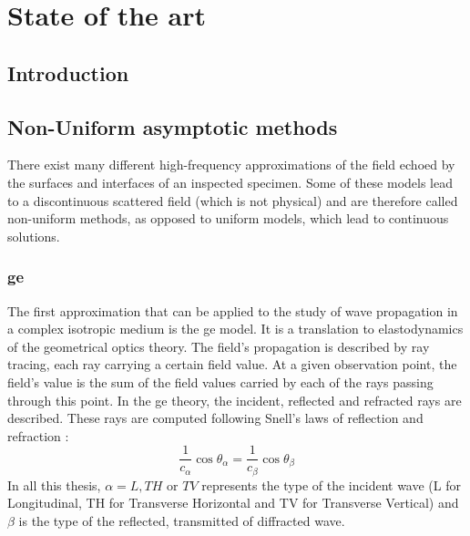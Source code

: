 \chapter[][Sate of the Art]{State of the art}
\label{chap-biblio}

\section*{Introduction}

\section{Non-Uniform asymptotic methods}

There exist many different high-frequency approximations of the field echoed by the surfaces and interfaces of an inspected specimen. Some of these models lead to a discontinuous scattered field (which is not physical) and are therefore called non-uniform methods, as opposed to uniform models, which lead to continuous solutions.
\subsection{\acrfull{ge}}
The first approximation that can be applied to the study of wave propagation in a complex isotropic medium is the \acrfull{ge} model. It is a translation to elastodynamics of the geometrical optics theory. The field's propagation is described by ray tracing, each ray carrying a certain field value. At a given observation point, the field's value is the sum of the field values carried by each of the rays passing through this point. In the \acrshort{ge} theory, the incident, reflected and refracted rays are described. These rays are computed following Snell's laws of reflection and refraction :
\begin{equation}
    \frac{1}{c_{\alpha}}\cos\theta_{\alpha} = \frac{1}{c_{\beta}} \cos\theta_{\beta}
    \label{Snellrefl}
\end{equation}
In all this thesis, $\alpha=L,TH$ or $TV$ represents the type of the incident wave (L for Longitudinal, TH for Transverse Horizontal and TV for Transverse Vertical) and $\beta$ is the type of the reflected, transmitted of diffracted wave.

